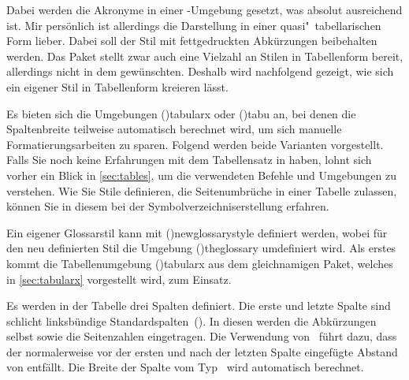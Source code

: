 \documentclass[%
  english,ngerman,%
  cdgeometry=no,DIV=12,%
  cd=false,cdfont=false,cdtitle=true,%
  headings=normal,%
  automark,%
  listof=toc,%
]{tudscrartcl}
\begin{document}
\begin{quoting}[rightmargin=0pt]
\glsdisablehyper
\printacronyms[style=simple]
\end{quoting}
%
Dabei werden die Akronyme in einer -Umgebung gesetzt,
was absolut ausreichend ist. Mir persönlich ist allerdings die Darstellung in 
einer quasi"~tabellarischen Form lieber. Dabei soll der Stil mit fettgedruckten 
Abkürzungen beibehalten werden. Das Paket  stellt zwar 
auch eine Vielzahl an Stilen in Tabellenform bereit, allerdings nicht in dem 
gewünschten. Deshalb wird nachfolgend gezeigt, wie sich ein eigener Stil in 
Tabellenform kreieren lässt.

Es bieten sich die Umgebungen \Environment(){tabularx} oder 
\Environment(){tabu} an, bei denen die Spaltenbreite teilweise 
automatisch berechnet wird, um sich manuelle Formatierungsarbeiten zu sparen. 
Folgend werden beide Varianten vorgestellt. Falls Sie noch keine Erfahrungen 
mit dem Tabellensatz in  haben, lohnt sich vorher ein Blick in 
\autoref{sec:tables}, um die verwendeten Befehle und Umgebungen zu verstehen. 
Wie Sie Stile definieren, die Seitenumbrüche in einer Tabelle zulassen, können 
Sie in diesem  bei der Symbolverzeichniserstellung 
erfahren.



Ein eigener Glossarstil kann mit \Macro(){newglossarystyle} 
definiert werden, wobei für den neu definierten Stil die Umgebung 
\Environment(){theglossary} umdefiniert wird. Als erstes 
kommt die Tabellenumgebung \Environment(){tabularx} aus dem 
gleichnamigen Paket, welches in \autoref{sec:tabularx} vorgestellt wird, zum 
Einsatz.

Es werden in der Tabelle drei Spalten definiert. Die erste und letzte Spalte 
sind schlicht linksbündige Standardspalten~(). In diesen werden die 
Abkürzungen selbst sowie die Seitenzahlen eingetragen. Die Verwendung 
von~ führt dazu, dass der normalerweise vor der ersten 
und nach der letzten Spalte eingefügte Abstand von  entfällt. 
Die Breite der Spalte vom Typ~ wird automatisch berechnet.
\end{document}
